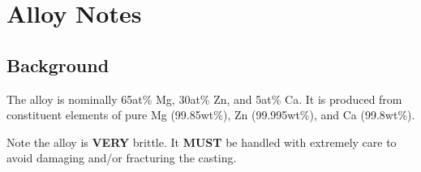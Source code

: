 \section{\MgZnCa Alloy Notes}

\subsection{Background}

The \MgZnCa alloy is nominally 65at\% Mg, 30at\% Zn, and 5at\% Ca. It is produced from constituent elements of pure Mg (99.85wt\%), Zn (99.995wt\%), and Ca (99.8wt\%). 

Note the \MgZnCa alloy is \textbf{VERY} brittle. It \textbf{MUST} be handled with extremely care to avoid damaging and/or fracturing the casting.

